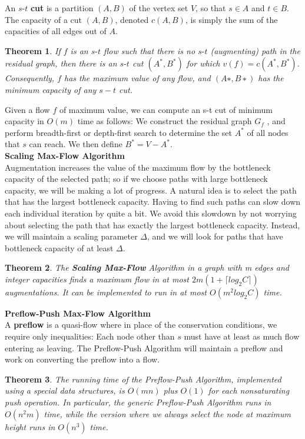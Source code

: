 \documentclass{report}
\newtheorem{Theorem}{Theorem}
\begin{document}
An $s\text{-}t$ \textbf{cut} is a partition $(A, B)$ of the vertex set $V$, so that $s \in A$ and $t \in B$. The capacity of a cut $(A, B)$, denoted $c(A, B)$, is simply the sum of the capacities of all edges out of $A$.

\begin{Theorem}
If $f$ is an $s\text{-}t$ flow such that there is no $s\text{-}t$ (augmenting) path in the residual graph, then there is an $s\text{-}t$ cut $(A^*, B^*)$ for which $v(f) = c(A^*, B^*)$. Consequently, $f$ has the maximum value of any flow, and $(A∗, B∗)$ has the minimum capacity of any $s-t$ cut.
\end{Theorem}

Given a flow $f$ of maximum value, we can compute an s-t cut of minimum capacity in $O(m)$ time as follows: We construct the residual graph $G_f$ , and perform breadth-first or depth-first search to
determine the set $A^*$ of all nodes that $s$ can reach. We then define $B^* = V − A^*$.\\

\textbf{Scaling Max-Flow Algorithm}\\
Augmentation increases the value of the maximum flow by the bottleneck capacity of the selected path; so if we choose paths with large bottleneck capacity, we will be making a lot of progress. A natural
idea is to select the path that has the largest bottleneck capacity. Having to find such paths can slow down each individual iteration by quite a bit. We avoid this slowdown by not worrying about selecting the path that has exactly the largest bottleneck capacity. Instead, we will maintain a scaling
parameter $\Delta$, and we will look for paths that have bottleneck capacity of at least $\Delta$.
\begin{Theorem}
	The \textbf{Scaling Max-Flow} Algorithm in a graph with m edges and integer
	capacities finds a maximum flow in at most $2m(1+ \lceil log_2 C\rceil)$ augmentations.
	It can be implemented to run in at most $O(m^2 log_2 C)$ time.
\end{Theorem}

\textbf{Preflow-Push Max-Flow Algorithm}\\
A \textbf{preflow} is a quasi-flow where in place of the conservation conditions, we require only inequalities: Each node other than $s$ must have at least as much flow entering as leaving. The Preflow-Push Algorithm will maintain a preflow and work on converting the preflow into a flow.
\begin{Theorem}
	The running time of the Preflow-Push Algorithm, implemented using
a special data structures, is $O(mn)$ plus $O(1)$ for each nonsaturating push
	operation. In particular, the generic Preflow-Push Algorithm runs in $O(n^2m)$
	time, while the version where we always select the node at maximum height
	runs in $O(n^3)$ time.
\end{Theorem}
\end{document}
